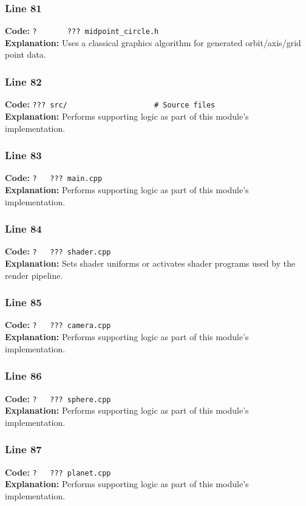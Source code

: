 \documentclass[11pt,a4paper]{article}
\begin{document}
\subsubsection*{Line 81}
\textbf{Code:} \verb|?       ??? midpoint_circle.h|\\
\textbf{Explanation:} Uses a classical graphics algorithm for generated orbit/axis/grid point data.

\subsubsection*{Line 82}
\textbf{Code:} \verb|??? src/                    # Source files|\\
\textbf{Explanation:} Performs supporting logic as part of this module's implementation.

\subsubsection*{Line 83}
\textbf{Code:} \verb|?   ??? main.cpp|\\
\textbf{Explanation:} Performs supporting logic as part of this module's implementation.

\subsubsection*{Line 84}
\textbf{Code:} \verb|?   ??? shader.cpp|\\
\textbf{Explanation:} Sets shader uniforms or activates shader programs used by the render pipeline.

\subsubsection*{Line 85}
\textbf{Code:} \verb|?   ??? camera.cpp|\\
\textbf{Explanation:} Performs supporting logic as part of this module's implementation.

\subsubsection*{Line 86}
\textbf{Code:} \verb|?   ??? sphere.cpp|\\
\textbf{Explanation:} Performs supporting logic as part of this module's implementation.

\subsubsection*{Line 87}
\textbf{Code:} \verb|?   ??? planet.cpp|\\
\textbf{Explanation:} Performs supporting logic as part of this module's implementation.
\end{document}
